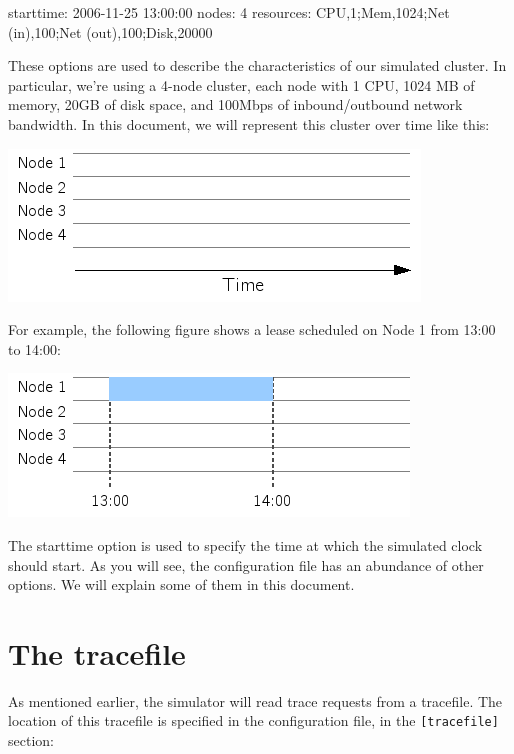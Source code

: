 \begin{wideshellverbatim}
[simulation]
starttime: 2006-11-25 13:00:00
nodes: 4
resources: CPU,1;Mem,1024;Net (in),100;Net (out),100;Disk,20000
\end{wideshellverbatim}

These options are used to describe the characteristics of our simulated cluster. In particular, we're using a 4-node cluster, each node with 1 CPU, 1024 MB of memory, 20GB of disk space, and 100Mbps of inbound/outbound network bandwidth. In this document, we will represent this cluster over time like this:

\begin{center}
\includegraphics{images/quickstart_leasegraph1.png}
\end{center}

For example, the following figure shows a lease scheduled on Node 1 from 13:00 to 14:00:

\begin{center}
\includegraphics{images/quickstart_leasegraph2.png}
\end{center}

The starttime option is used to specify the time at which the simulated clock should start. As you will see, the configuration file has an abundance of other options. We will explain some of them in this document.

\section{The tracefile}

As mentioned earlier, the simulator will read trace requests from a tracefile. The location of this tracefile is specified in the configuration file, in the \texttt{[tracefile]} section:

